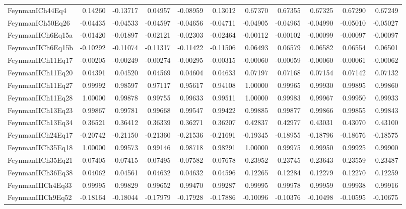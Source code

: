 \begin{tabular}{lrrrrrrrrrr}
FeynmanICh44Eq4 & 0.14260 & -0.13717 & 0.04957 & -0.08959 & 0.13012 & 0.67370 & 0.67355 & 0.67325 & 0.67290 & 0.67249 \\
FeynmanICh50Eq26 & -0.04435 & -0.04533 & -0.04597 & -0.04656 & -0.04711 & -0.04905 & -0.04965 & -0.04990 & -0.05010 & -0.05027 \\
FeynmanIICh6Eq15a & -0.01420 & -0.01897 & -0.02121 & -0.02303 & -0.02464 & -0.00112 & -0.00102 & -0.00099 & -0.00097 & -0.00097 \\
FeynmanIICh6Eq15b & -0.10292 & -0.11074 & -0.11317 & -0.11422 & -0.11506 & 0.06493 & 0.06579 & 0.06582 & 0.06554 & 0.06501 \\
FeynmanIICh11Eq17 & -0.00205 & -0.00249 & -0.00274 & -0.00295 & -0.00315 & -0.00060 & -0.00059 & -0.00060 & -0.00061 & -0.00062 \\
FeynmanIICh11Eq20 & 0.04391 & 0.04520 & 0.04569 & 0.04604 & 0.04633 & 0.07197 & 0.07168 & 0.07154 & 0.07142 & 0.07132 \\
FeynmanIICh11Eq27 & 0.99992 & 0.98597 & 0.97117 & 0.95617 & 0.94108 & 1.00000 & 0.99965 & 0.99930 & 0.99895 & 0.99860 \\
FeynmanIICh11Eq28 & 1.00000 & 0.99878 & 0.99755 & 0.99633 & 0.99511 & 1.00000 & 0.99983 & 0.99967 & 0.99950 & 0.99933 \\
FeynmanIICh13Eq23 & 0.99867 & 0.99781 & 0.99668 & 0.99547 & 0.99422 & 0.99885 & 0.99877 & 0.99866 & 0.99855 & 0.99843 \\
FeynmanIICh13Eq34 & 0.36521 & 0.36412 & 0.36339 & 0.36271 & 0.36207 & 0.42837 & 0.42977 & 0.43031 & 0.43070 & 0.43100 \\
FeynmanIICh24Eq17 & -0.20742 & -0.21150 & -0.21360 & -0.21536 & -0.21691 & -0.19345 & -0.18955 & -0.18796 & -0.18676 & -0.18575 \\
FeynmanIICh35Eq18 & 1.00000 & 0.99573 & 0.99146 & 0.98718 & 0.98291 & 1.00000 & 0.99975 & 0.99950 & 0.99925 & 0.99900 \\
FeynmanIICh35Eq21 & -0.07405 & -0.07415 & -0.07495 & -0.07582 & -0.07678 & 0.23952 & 0.23745 & 0.23643 & 0.23559 & 0.23487 \\
FeynmanIICh36Eq38 & 0.04062 & 0.04561 & 0.04632 & 0.04632 & 0.04596 & 0.12265 & 0.12284 & 0.12279 & 0.12270 & 0.12259 \\
FeynmanIIICh4Eq33 & 0.99995 & 0.99829 & 0.99652 & 0.99470 & 0.99287 & 0.99995 & 0.99978 & 0.99959 & 0.99938 & 0.99916 \\
FeynmanIIICh9Eq52 & -0.18164 & -0.18044 & -0.17979 & -0.17928 & -0.17886 & -0.10096 & -0.10376 & -0.10498 & -0.10595 & -0.10675 \\

\end{tabular}
